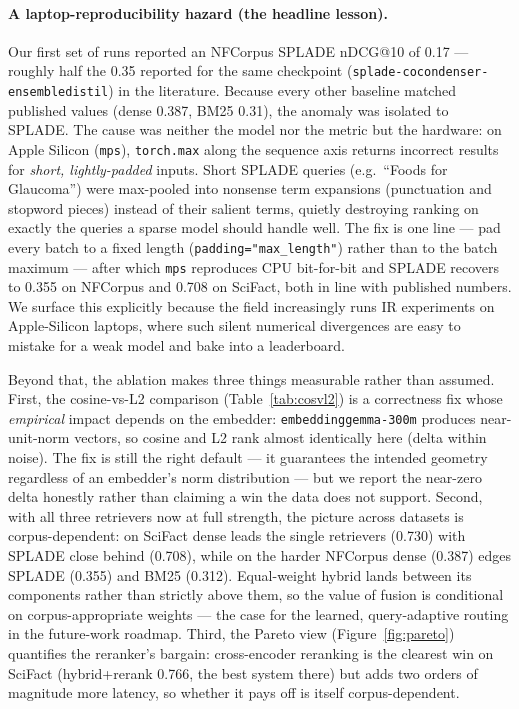 \documentclass[11pt]{article}
\begin{document}
\paragraph{A laptop-reproducibility hazard (the headline lesson).}
Our first set of runs reported an NFCorpus SPLADE nDCG@10 of 0.17 --- roughly half
the 0.35 reported for the same checkpoint
(\texttt{splade-cocondenser-ensembledistil}) in the literature. Because every
other baseline matched published values (dense 0.387, BM25 0.31), the anomaly was
isolated to SPLADE. The cause was neither the model nor the metric but the
hardware: on Apple Silicon (\texttt{mps}), \texttt{torch.max} along the sequence
axis returns incorrect results for \emph{short, lightly-padded} inputs. Short
SPLADE queries (e.g.\ ``Foods for Glaucoma'') were max-pooled into nonsense term
expansions (punctuation and stopword pieces) instead of their salient terms,
quietly destroying ranking on exactly the queries a sparse model should handle
well. The fix is one line --- pad every batch to a fixed length
(\texttt{padding="max\_length"}) rather than to the batch maximum --- after which
\texttt{mps} reproduces CPU bit-for-bit and SPLADE recovers to 0.355 on NFCorpus
and 0.708 on SciFact, both in line with published numbers. We surface this
explicitly because the field increasingly runs IR experiments on Apple-Silicon
laptops, where such silent numerical divergences are easy to mistake for a weak
model and bake into a leaderboard.

Beyond that, the ablation makes three things measurable rather than assumed.
First, the cosine-vs-L2 comparison (Table~\ref{tab:cosvl2}) is a correctness fix
whose \emph{empirical} impact depends on the embedder: \texttt{embeddinggemma-300m}
produces near-unit-norm vectors, so cosine and L2 rank almost identically here
(delta within noise). The fix is still the right default --- it guarantees the
intended geometry regardless of an embedder's norm distribution --- but we report
the near-zero delta honestly rather than claiming a win the data does not support.
Second, with all three retrievers now at full strength, the picture across
datasets is corpus-dependent: on SciFact dense leads the single retrievers (0.730)
with SPLADE close behind (0.708), while on the harder NFCorpus dense (0.387) edges
SPLADE (0.355) and BM25 (0.312). Equal-weight hybrid lands between its components
rather than strictly above them, so the value of fusion is conditional on
corpus-appropriate weights --- the case for the learned, query-adaptive routing in
the future-work roadmap. Third, the Pareto view (Figure~\ref{fig:pareto})
quantifies the reranker's bargain: cross-encoder reranking is the clearest win on
SciFact (hybrid+rerank 0.766, the best system there) but adds two orders of
magnitude more latency, so whether it pays off is itself corpus-dependent.
\end{document}
